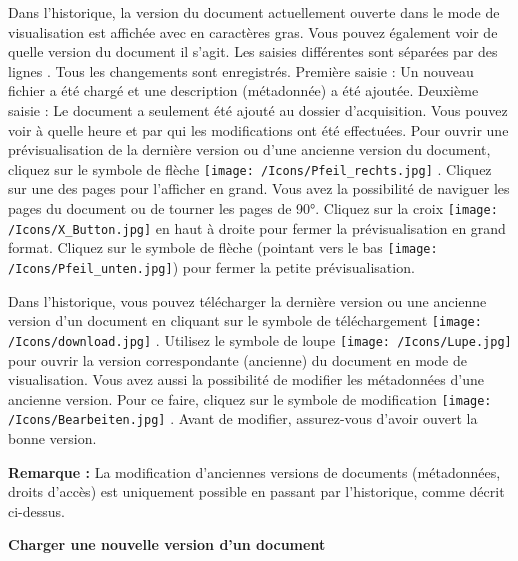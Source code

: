  Dans l'historique, la version du document actuellement ouverte dans le mode de visualisation est affichée avec en caractères gras. Vous pouvez également voir de quelle version du document il s'agit. Les saisies différentes sont séparées par des lignes . Tous les changements sont enregistrés. Première saisie : Un nouveau fichier a été chargé et une description (métadonnée) a été ajoutée. Deuxième saisie : Le document a seulement été ajouté au dossier d'acquisition. Vous pouvez voir à quelle heure et par qui les modifications ont été effectuées. Pour ouvrir une prévisualisation de la dernière version ou d'une ancienne version du document, cliquez sur le symbole de flèche \texttt{[image: /Icons/Pfeil\_rechts.jpg]} . Cliquez sur une des pages pour l'afficher en grand. Vous avez la possibilité de naviguer les pages du document ou de tourner les pages de 90°. Cliquez sur la croix \texttt{[image: /Icons/X\_Button.jpg]} en haut à droite pour fermer la prévisualisation en grand format. Cliquez sur le symbole de flèche (pointant vers le bas \texttt{[image: /Icons/Pfeil\_unten.jpg]}) pour fermer la petite prévisualisation.

Dans l'historique, vous pouvez télécharger la dernière version ou une ancienne version d'un document en cliquant sur le symbole de téléchargement \texttt{[image: /Icons/download.jpg]} . Utilisez le symbole de loupe \texttt{[image: /Icons/Lupe.jpg]}  pour ouvrir la version correspondante (ancienne) du document en mode de visualisation. Vous avez aussi la possibilité de modifier les métadonnées d'une ancienne version. Pour ce faire, cliquez sur le symbole de modification \texttt{[image: /Icons/Bearbeiten.jpg]} . Avant de modifier, assurez-vous d'avoir ouvert la bonne version.

\vspace{\baselineskip}

\textbf{Remarque :} La modification d'anciennes versions de documents (métadonnées, droits d'accès) est uniquement possible en passant par l'historique, comme décrit ci-dessus.

\pagebreak

\textbf{Charger une nouvelle version d'un document}

\vspace{\baselineskip}

